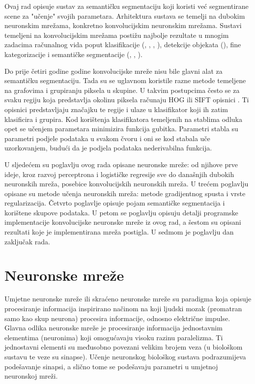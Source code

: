 \documentclass[times, utf8, diplomski, numeric]{fer}
\begin{document}
Ovaj rad opisuje sustav za semantičku segmentaciju koji koristi već segmentirane scene za "učenje" svojih parametara. Arhitektura sustava se temelji na dubokim neuronskim mrežama, konkretno konvolucijskim neuronskim mrežama. Sustavi temeljeni na konvolucijskim mrežama postižu najbolje rezultate  u mnogim zadacima računalnog vida poput klasifikacije (\cite{krizhevsky_imagenet}, \cite{googlenet}, \cite{vgg_net}, \cite{overfeat}), detekcije objekata (\cite{girshick2014rcnn}), fine kategorizacije \cite{zhang14finegrained} i semantičke segmentacije (\cite{farabet_pami}, \cite{long_shelhamer}, \cite{ChenPKMY14}).

Do prije četiri godine godine konvolucijske mreže nisu bile glavni alat za semantičku segmentaciju. Tada su se uglavnom koristile razne metode temeljene na grafovima i grupiranju piksela u skupine. U takvim postupcima često se za svaku regiju koja predstavlja okolinu piksela računaju HOG  ili SIFT  opisnici \cite{Lowe:1999}. Ti opisnici predstavljaju značajku te regije i ulaze u klasifikator koji ih zatim klasificira i grupira.
Kod korištenja klasifikatora temeljenih na stablima odluka opet se učenjem parametara minimizira funkcija gubitka. Parametri stabla su parametri podjele podataka u svakom čvoru  i oni se kod stabala uče uzorkovanjem, budući da je podjela podataka nederivabilna funkcija.

U sljedećem su poglavlju ovog rada opisane neuronske mreže: od njihove prve ideje, kroz razvoj perceptrona i logističke regresije sve do današnjih dubokih neuronskih mreža, posebice konvolucijskih neuronskih mreža. U trećem poglavlju opisane su metode učenja neuronskih mreža: metode gradijentnog spusta i vrste regularizacija. Četvrto poglavlje opisuje pojam semantičke segmentacija i korištene skupove podataka. U petom se poglavlju opisuju detalji programske implementacije konvolucijske neuronske mreže iz ovog rad, a šestom su opisani rezultati koje je implementirana mreža postigla. U sedmom je poglavlju dan zaključak rada.

\chapter{Neuronske mreže}

Umjetne neuronske mreže  ili skraćeno neuronske mreže su paradigma koja opisuje procesiranje informacija inspirirano načinom na koji ljudski mozak (promatran samo kao skup neurona) procesira informacije, odnosno električne impulse. Glavna odlika neuronske mreže je procesiranje informacija jednostavnim elementima (neuronima) koji omogućavaju visoku razinu paralelizma. Ti jednostavni elementi su međusobno povezani velikim brojem veza (u biološkom sustavu te veze su sinapse). Učenje neuronskog biološkog sustava podrazumijeva podešavanje sinapsi, a slično tome se podešavaju parametri u umjetnoj neuronskoj mreži.
\end{document}
